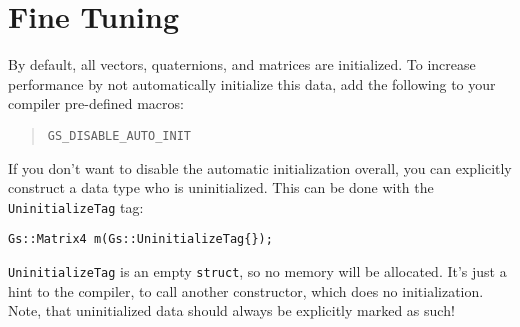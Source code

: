 \documentclass{article}
\begin{document}
\section*{Fine Tuning}

By default, all vectors, quaternions, and matrices are initialized. To increase performance by not automatically
initialize this data, add the following to your compiler pre-defined macros:
\begin{quote}
\texttt{GS\_DISABLE\_AUTO\_INIT}
\end{quote}
If you don't want to disable the automatic initialization overall, you can explicitly construct a data type
who is uninitialized. This can be done with the \texttt{UninitializeTag} tag:
\begin{lstlisting}
Gs::Matrix4 m(Gs::UninitializeTag{});
\end{lstlisting}
\texttt{UninitializeTag} is an empty \texttt{struct}, so no memory will be allocated. It's just a hint to the compiler,
to call another constructor, which does no initialization.
Note, that uninitialized data should always be explicitly marked as such!
\end{document}

